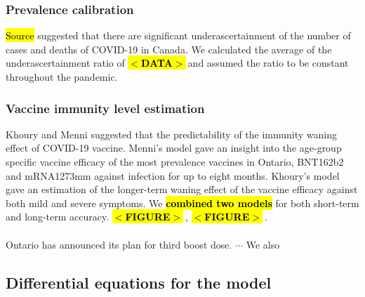 \documentclass[12pt]{article}
\newcommand{\emphasize}[1]{\textcolor{ReD}{\textbf{\hl{#1}}}}
\newcommand{\pendingdata}{\textbf{\hl{$<$DATA$>$}}$ \ $}
\newcommand{\suppfigure}{{\textbf{\hl{$<$FIGURE$>$}}}$ \ $}
\newcommand{\mainfigure}{\textcolor{ReD}{\textbf{\hl{$<$FIGURE$>$}}}$ \ $}
\begin{document}
\subsubsection{Prevalence calibration}

\hl{Source} suggested that there are significant underascertainment of the number of cases and deaths of COVID-19 in Canada. \cite{ref2} \cite{ref3} We calculated the average of the underascertainment ratio of \pendingdata and assumed the ratio to be constant throughout the pandemic.

\subsubsection{Vaccine immunity level estimation}

Khoury and Menni suggested that the predictability of the immunity waning effect of COVID-19 vaccine.  \cite{ref4} \cite{ref5} Menni's model gave an insight into the age-group specific vaccine efficacy of the most prevalence vaccines in Ontario, BNT162b2 and mRNA1273mm against infection for up to eight months. Khoury's model gave an estimation of the longer-term waning effect of the vaccine efficacy against both mild and severe symptoms. We \emphasize{combined two models} for both short-term and long-term accuracy. \mainfigure, \suppfigure.\\\\
Ontario has announced its plan for third boost dose. $\cdots$ We also

\subsection{Differential equations for the model}
\end{document}
